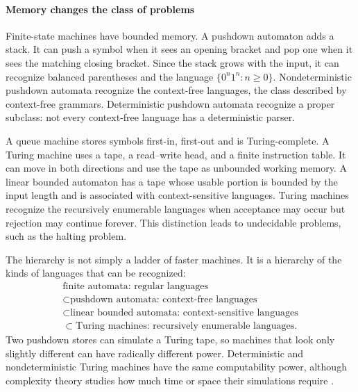 \paragraph{Memory changes the class of problems}

Finite-state machines have bounded memory. A pushdown automaton adds a stack. It can push a symbol when it sees an opening bracket and pop one when it sees the matching closing bracket. Since the stack grows with the input, it can recognize balanced parentheses and the language $\{0^n1^n:n\geq0\}$. Nondeterministic pushdown automata recognize the context-free languages, the class described by context-free grammars. Deterministic pushdown automata recognize a proper subclass: not every context-free language has a deterministic parser.

A queue machine stores symbols first-in, first-out and is Turing-complete. A Turing machine uses a tape, a read--write head, and a finite instruction table. It can move in both directions and use the tape as unbounded working memory. A linear bounded automaton has a tape whose usable portion is bounded by the input length and is associated with context-sensitive languages. Turing machines recognize the recursively enumerable languages when acceptance may occur but rejection may continue forever. This distinction leads to undecidable problems, such as the halting problem.

The hierarchy is not simply a ladder of faster machines. It is a hierarchy of the kinds of languages that can be recognized:
\[
\begin{array}{c}
\text{finite automata: regular languages}\\
\subset \text{pushdown automata: context-free languages}\\
\subset \text{linear bounded automata: context-sensitive languages}\\
\subset \text{Turing machines: recursively enumerable languages}.
\end{array}
\]
Two pushdown stores can simulate a Turing tape, so machines that look only slightly different can have radically different power. Deterministic and nondeterministic Turing machines have the same computability power, although complexity theory studies how much time or space their simulations require \cite{automata_theory_ref2,automata_theory_ref5}.

